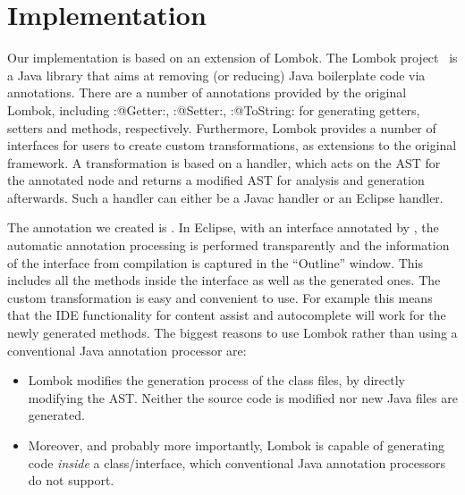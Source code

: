 \section{Implementation}

Our implementation is based on an extension of Lombok. The Lombok
project~\cite{lombok} is a Java library that aims at removing (or
reducing) Java boilerplate code via
annotations. There are a number of annotations provided by the
original Lombok, including \Q:@Getter:, \Q:@Setter:,
\Q:@ToString: for generating getters, setters and 
methods, respectively.  Furthermore, Lombok provides a number of
interfaces for users to create custom transformations, as extensions
to the original framework.
A transformation is based on a handler, which acts on the AST for the
annotated node and returns a modified AST for analysis and
generation afterwards. Such a handler can either be a Javac handler or
an Eclipse handler.

The annotation we created is \mixin. In Eclipse, with an interface annotated by
\mixin, the automatic annotation processing is performed transparently and the information of
the interface from compilation is captured in the ``Outline'' window. This includes
all the methods inside the interface as well as the generated ones.  The custom
transformation is easy and convenient to use.  For example this means that the
IDE functionality for content assist and autocomplete will work for the newly generated
methods. The biggest reasons to use Lombok rather than using a conventional Java
 annotation processor are:
\begin{itemize}
\item Lombok modifies the generation process of the class files, by directly modifying the AST.
Neither the source code is modified nor new Java files are generated.
\item Moreover, and probably more importantly, Lombok is capable of generating
  code \emph{inside} a class/interface, which conventional
  Java annotation processors do not support.
\end{itemize}

